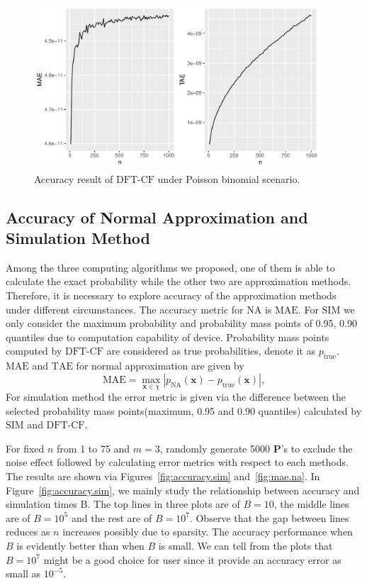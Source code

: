 \documentclass[12pt]{article}
\newcommand{\Pmat}{\mathbf{P}}
\newcommand{\TAE}{{\textrm{TAE}}}
\newcommand{\MAE}{{\textrm{MAE}}}
\newcommand{\xvec}{\boldsymbol{x}}
\newcommand{\SIM}{{\textrm{SIM}}}
\newcommand{\NA}{{\textrm{NA}}}
\newcommand{\dft}{{\textrm{DFT-CF}}}
\begin{document}
\begin{figure}%
\begin{center}
	\includegraphics[width=0.95\textwidth]{figures/poib.pdf}
	\caption{Accuracy result of $\dft$ under Poisson binomial scenario.}
	\label{fig:dft.vs.pb}
\end{center}
\end{figure}


\subsection{Accuracy of Normal Approximation and Simulation Method}
Among the three computing algorithms we proposed, one of them is able to calculate the exact probability while the other two are approximation methods. Therefore, it is necessary to explore accuracy of the approximation methods under different circumstances. The accuracy metric for $\NA$ is $\MAE$. For $\SIM$ we only consider the maximum probability and probability mass points of 0.95, 0.90 quantiles due to computation capability of device. Probability mass points computed by $\dft$ are considered as true probabilities, denote it as $p_{\textrm{true}}$.
$\MAE$ and $\TAE$ for normal approximation are given by
\begin{equation*}
    \MAE = \max_{\xvec \in \chi}|p_{\NA}(\xvec)-p_{\textrm{true}}(\xvec)|,
\end{equation*}
For simulation method the error metric is given via the difference between the selected probability mass points(maximum, 0.95 and 0.90 quantiles) calculated by $\SIM$ and $\dft$.

For fixed $n$ from 1 to 75 and $m=3$, randomly generate 5000 $\Pmat$'s to exclude the noise effect followed by calculating error metrics with respect to each methods. The results are shown via Figures~\ref{fig:accuracy.sim} and~\ref{fig:mae.na}. In Figure~\ref{fig:accuracy.sim}, we mainly study the relationship between accuracy and simulation times $\mbox{B}$. The top lines in three plots are of $B=10$,  the middle lines are of $B=10^5$ and the rest are of $B=10^7$. Observe that the gap between lines reduces as $n$ increases possibly due to sparsity. The accuracy performance when $B$ is evidently better than when $B$ is small. We can tell from the plots that $B=10^7$ might be a good choice for user since it provide an accuracy error as small as $10^{-5}$.
\end{document}
